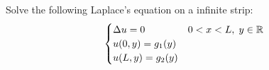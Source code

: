 Solve the following Laplace's equation on a infinite strip:
$$\begin{cases}
    \Delta u = 0 & 0<x<L, \; y\in\mathbb{R}\\
    u(0,y) = g_1(y)\\
    u(L,y) = g_2(y)
\end{cases}$$

\soln* 

\newpage

$ $